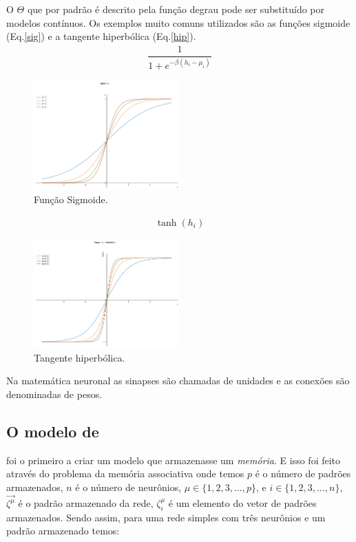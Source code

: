 O $\Theta$ que por padrão é descrito pela função degrau pode ser substituído por modelos contínuos. Os exemplos muito comuns utilizados são as funções sigmoide (Eq.\ref{sig}) e a tangente hiperbólica (Eq.\ref{hip}).
\begin{eqnarray}
\dfrac{1}{1+e^{-\beta(h_{i}-\mu_{i})}}
\label{sig}	
\end{eqnarray}

\begin{figure}[H]
	\centering
	\includegraphics[width=0.5\textwidth]{Imagens/sigmoide.png}
	\caption{Função Sigmoide.}
	\label{HIP}
\end{figure}

\begin{eqnarray}
\tanh(h_{i})
\label{hip}
\end{eqnarray}

\begin{figure}[H]
	\centering
	\includegraphics[width=0.5\textwidth]{Imagens/tanh.png}
	\caption{Tangente hiperbólica.}
	\label{HIP}
\end{figure}


Na matemática neuronal as sinapses são chamadas de unidades e as conexões são denominadas de pesos. 

\subsection{O modelo de \citet{Hopfield1982}}

 \citet{Hopfield1982} foi o primeiro a criar um modelo que armazenasse um \textit{memória}. E isso foi feito através do problema da memória associativa onde temos $p$ é o número de padrões armazenados, $n$ é o número de neurônios, $\mu \in \{1,2,3,\hdots, p\}$, e $i \in \{1,2,3,\hdots, n\}$, $\vec{\zeta^{\mu}}$ é o padrão armazenado da rede, $\zeta^{\mu}_{i}$ é um elemento do vetor de padrões armazenados. Sendo assim, para uma rede simples com três neurônios e um padrão armazenado temos:
 
